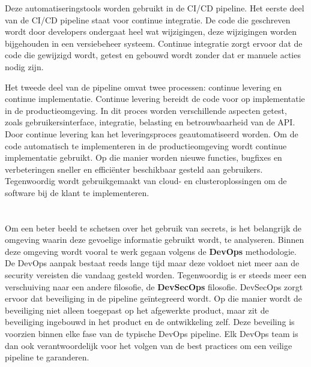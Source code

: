 Deze automatiseringstools worden gebruikt in de CI/CD pipeline. Het eerste deel van de CI/CD pipeline staat voor continue integratie. De code die geschreven wordt door developers ondergaat heel wat wijzigingen, deze wijzigingen worden bijgehouden in een versiebeheer systeem. Continue integratie zorgt ervoor dat de code die gewijzigd wordt, getest en gebouwd wordt zonder dat er manuele acties nodig zijn.
\newline

Het tweede deel van de pipeline omvat twee processen: continue levering en continue implementatie. Continue levering bereidt de code voor op implementatie in de productieomgeving. In dit proces worden verschillende aspecten getest, zoals gebruikersinterface, integratie, belasting en betrouwbaarheid van de API. Door continue levering kan het leveringsproces geautomatiseerd worden. Om de code automatisch te implementeren in de productieomgeving wordt continue implementatie gebruikt. Op die manier worden nieuwe functies, bugfixes en verbeteringen sneller en efficiënter beschikbaar gesteld aan gebruikers. Tegenwoordig wordt gebruikgemaakt van cloud- en clusteroplossingen om de software bij de klant te implementeren. \autocite{DavidFound2021}

\section{}
\label{sec:DevSecOps binnen de pipeline}

\subsection{}
\label{sec:DevSecOps impact op de pipeline}
Om een beter beeld te schetsen over het gebruik van secrets, is het belangrijk de omgeving waarin deze gevoelige informatie gebruikt wordt, te analyseren. Binnen deze omgeving wordt vooral te werk gegaan volgens de \textbf{DevOps} methodologie. De DevOps aanpak bestaat reeds lange tijd maar deze voldoet niet meer aan de security vereisten die vandaag gesteld worden. Tegenwoordig is er steeds meer een verschuiving naar een andere filosofie, de \textbf{DevSecOps} filosofie. DevSecOps zorgt ervoor dat beveiliging in de pipeline geïntegreerd wordt. Op die manier wordt de beveiliging niet alleen toegepast op het afgewerkte product, maar zit de beveiliging ingebouwd in het product en de ontwikkeling zelf. Deze beveiling is voorzien binnen elke fase van de typische DevOps pipeline. Elk DevOps team is dan ook verantwoordelijk voor het volgen van de best practices om een veilige pipeline te garanderen. \autocite{Zettler2020}
\newline

